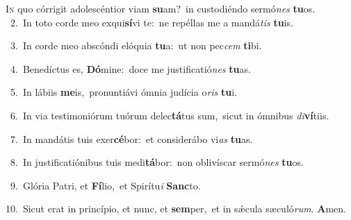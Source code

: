 \lettrine{\initial\textcolor{\initialcolor}{I}}{n} quo córrigit adolescéntior viam \textbf{su}\-am?~\star in custodiéndo sermó\textit{nes} \textbf{tu}\-os.\\
{\numbfont\textcolor{\numbcolor}{~2.}}~In toto corde meo exqui\-\textbf{sí}\-vi te:~\star ne repéllas me a mandá\textit{tis} \textbf{tu}\-is.\par
{\numbfont\textcolor{\numbcolor}{~3.}}~In corde meo abscóndi elóquia \textbf{tu}\-a:~\star ut non pec\textit{cem} \textbf{ti}\-bi.\par
{\numbfont\textcolor{\numbcolor}{~4.}}~Benedíctus es, \textbf{Dó}\-mine:~\star doce me justificatió\textit{nes} \textbf{tu}\-as.\par
{\numbfont\textcolor{\numbcolor}{~5.}}~In lábiis \textbf{me}\-is,~\star pronuntiávi ómnia judícia o\textit{ris} \textbf{tu}\-i.\par
{\numbfont\textcolor{\numbcolor}{~6.}}~In via testimoniórum tuórum delec\-\textbf{tá}\-tus sum,~\star sicut in ómnibus \textit{di}\-\textbf{ví}tiis.\par
{\numbfont\textcolor{\numbcolor}{~7.}}~In mandátis tuis exer\-\textbf{cé}\-bor:~\star et considerábo vi\textit{as} \textbf{tu}\-as.\par
{\numbfont\textcolor{\numbcolor}{~8.}}~In justificatiónibus tuis medi\-\textbf{tá}\-bor:~\star non oblivíscar sermó\textit{nes} \textbf{tu}\-os.\par
{\numbfont\textcolor{\numbcolor}{~9.}}~Glória Patri, et \textbf{Fí}\-lio,~\star et Spirítu\textit{i} \textbf{Sanc}\-to.\par
{\numbfont\textcolor{\numbcolor}{10.}}~Sicut erat in princípio, et nunc, et \textbf{sem}\-per,~\star et in sǽcula sæculó\-\textit{rum}\-. \textbf{A}\-men.\par
